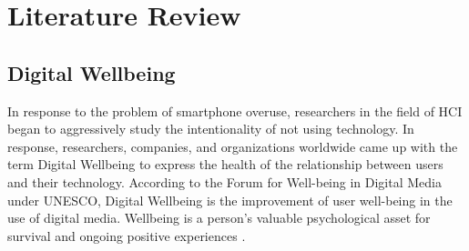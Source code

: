 \documentclass[conference]{IEEEtran}
\begin{document}
\section{Literature Review}


\subsection{Digital Wellbeing}
In response to the problem of smartphone overuse, researchers in the field of HCI began to aggressively study the intentionality of not using technology. In response, researchers, companies, and organizations worldwide came up with the term Digital Wellbeing to express the health of the relationship between users and their technology. According to the Forum for Well-being in Digital Media under UNESCO, Digital Wellbeing is the improvement of user well-being in the use of digital media. Wellbeing is a person's valuable psychological asset for survival and ongoing positive experiences \cite{unesco2015dwconference}.
\end{document}
